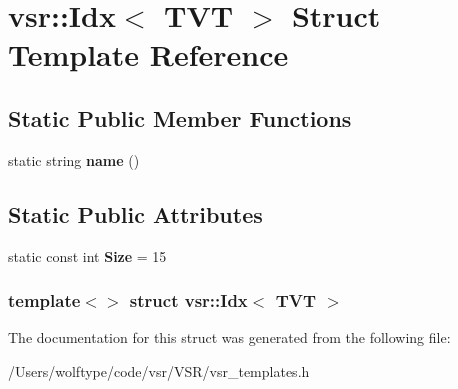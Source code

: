 \hypertarget{structvsr_1_1_idx_3_01_t_v_t_01_4}{\section{vsr\-:\-:Idx$<$ T\-V\-T $>$ Struct Template Reference}
\label{structvsr_1_1_idx_3_01_t_v_t_01_4}
}
\subsection*{Static Public Member Functions}
\begin{DoxyCompactItemize}
\item 
\hypertarget{structvsr_1_1_idx_3_01_t_v_t_01_4_a9a23672d305693a399c3e4fac04d8ac8}{static string {\bfseries name} ()}\label{structvsr_1_1_idx_3_01_t_v_t_01_4_a9a23672d305693a399c3e4fac04d8ac8}

\end{DoxyCompactItemize}
\subsection*{Static Public Attributes}
\begin{DoxyCompactItemize}
\item 
\hypertarget{structvsr_1_1_idx_3_01_t_v_t_01_4_aad45cf0d8dd73d864c2e5fd5a53e7eab}{static const int {\bfseries Size} = 15}\label{structvsr_1_1_idx_3_01_t_v_t_01_4_aad45cf0d8dd73d864c2e5fd5a53e7eab}

\end{DoxyCompactItemize}
\subsubsection*{template$<$$>$ struct vsr\-::\-Idx$<$ T\-V\-T $>$}



The documentation for this struct was generated from the following file\-:\begin{DoxyCompactItemize}
\item 
/\-Users/wolftype/code/vsr/\-V\-S\-R/vsr\-\_\-templates.\-h\end{DoxyCompactItemize}

